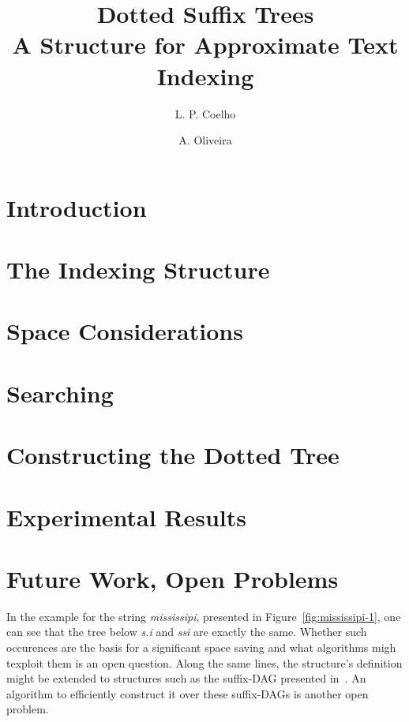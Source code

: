 \documentclass[a4paper,10pt]{article}
\title{Dotted Suffix Trees\\A Structure for Approximate Text Indexing}
\author{L. P. Coelho \and A. Oliveira}
\newcommand{\putstring}[1]{\textsl{#1}}
\begin{document}
\maketitle

\begin{abstract}

\end{abstract}

\section{Introduction}


\section{The Indexing Structure}

\section{Space Considerations}

\section{Searching}

\section{Constructing the Dotted Tree}

\section{Experimental Results}

\section{Future Work, Open Problems}

In the example for the string \putstring{mississipi}, presented in Figure~\ref{fig:mississipi-1}, one can see that the tree below \putstring{s.i} and \putstring{ssi} are exactly the same. Whether such occurences are the basis for a significant space saving and what algorithms migh texploit them is an open question.
Along the same lines, the structure's definition might be extended to structures such as the suffix-DAG presented in~\cite[7.7]{gusfield:algorithms}. An algorithm to efficiently construct it over these suffix-DAGs is another open problem.



\end{document}
